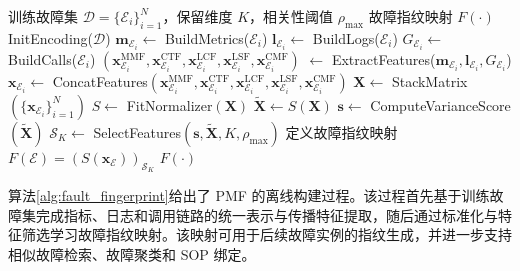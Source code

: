 \begin{algorithm}[!t]
    \caption{\enspace PMF 故障指纹构建算法}
    \label{alg:fault_fingerprint}
    \begin{algorithmic}[1]
        \Require 训练故障集 $\mathcal{D}=\{\mathcal{E}_i\}_{i=1}^{N}$，保留维度 $K$，相关性阈值 $\rho_{\max}$
        \Ensure 故障指纹映射 $F(\cdot)$
        \State InitEncoding($\mathcal{D}$) 
            \State $\mathbf{m}_{\mathcal{E}_i} \leftarrow$ BuildMetrics($\mathcal{E}_i$) 
            \State $\mathbf{l}_{\mathcal{E}_i} \leftarrow$ BuildLogs($\mathcal{E}_i$) 
            \State $G_{\mathcal{E}_i} \leftarrow$ BuildCalls($\mathcal{E}_i$) 
            \State $(\mathbf{x}^{\mathrm{MMF}}_{\mathcal{E}_i},\mathbf{x}^{\mathrm{CTF}}_{\mathcal{E}_i},\mathbf{x}^{\mathrm{LCF}}_{\mathcal{E}_i},\mathbf{x}^{\mathrm{LSF}}_{\mathcal{E}_i},\mathbf{x}^{\mathrm{CMF}}_{\mathcal{E}_i})$
            \State \hspace{1.5em} $\leftarrow$ ExtractFeatures($\mathbf{m}_{\mathcal{E}_i},\mathbf{l}_{\mathcal{E}_i},G_{\mathcal{E}_i}$) 
            \State $\mathbf{x}_{\mathcal{E}_i} \leftarrow$ ConcatFeatures$(\mathbf{x}^{\mathrm{MMF}}_{\mathcal{E}_i},\mathbf{x}^{\mathrm{CTF}}_{\mathcal{E}_i},\mathbf{x}^{\mathrm{LCF}}_{\mathcal{E}_i},\mathbf{x}^{\mathrm{LSF}}_{\mathcal{E}_i},\mathbf{x}^{\mathrm{CMF}}_{\mathcal{E}_i})$ 
        \EndFor
        \State $\mathbf{X} \leftarrow$ StackMatrix$(\{\mathbf{x}_{\mathcal{E}_i}\}_{i=1}^{N})$ 
        \State $S \leftarrow$ FitNormalizer$(\mathbf{X})$ 
        \State $\tilde{\mathbf{X}} \leftarrow S(\mathbf{X})$ 
        \State $\mathbf{s} \leftarrow$ ComputeVarianceScore$(\tilde{\mathbf{X}})$ 
        \State $\mathcal{S}_{K} \leftarrow$ SelectFeatures$(\mathbf{s},\tilde{\mathbf{X}},K,\rho_{\max})$ 
        \State 定义故障指纹映射 $F(\mathcal{E})=\left(S(\mathbf{x}_{\mathcal{E}})\right)_{\mathcal{S}_{K}}$
        \State \Return $F(\cdot)$
    \end{algorithmic}
\end{algorithm}



算法\ref{alg:fault_fingerprint}给出了 PMF 的离线构建过程。该过程首先基于训练故障集完成指标、日志和调用链路的统一表示与传播特征提取，随后通过标准化与特征筛选学习故障指纹映射。该映射可用于后续故障实例的指纹生成，并进一步支持相似故障检索、故障聚类和 SOP 绑定。

